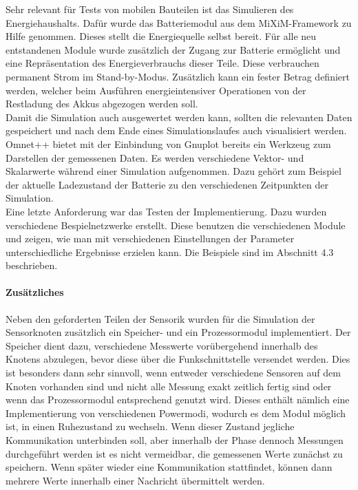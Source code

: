 Sehr relevant für Tests von mobilen Bauteilen ist das Simulieren des Energiehaushalts. Dafür wurde das Batteriemodul aus dem MiXiM-Framework zu Hilfe genommen. Dieses stellt die Energiequelle selbst bereit. Für alle neu entstandenen Module wurde zusätzlich der Zugang zur Batterie ermöglicht und eine Repräsentation des Energieverbrauchs dieser Teile. Diese verbrauchen permanent Strom im Stand-by-Modus. Zusätzlich kann ein fester Betrag definiert werden, welcher beim Ausführen energieintensiver Operationen von der Restladung des Akkus abgezogen werden soll.\\
Damit die Simulation auch ausgewertet werden kann, sollten die relevanten Daten gespeichert und nach dem Ende eines Simulationslaufes auch visualisiert werden. Omnet++ bietet mit der Einbindung von Gnuplot bereits ein Werkzeug zum Darstellen der gemessenen Daten. Es werden verschiedene Vektor- und Skalarwerte während einer Simulation aufgenommen. Dazu gehört zum Beispiel der aktuelle Ladezustand der Batterie zu den verschiedenen Zeitpunkten der Simulation.\\
Eine letzte Anforderung war das Testen der Implementierung. Dazu wurden verschiedene Bespielnetzwerke erstellt. Diese benutzen die verschiedenen Module und zeigen, wie man mit verschiedenen Einstellungen der Parameter unterschiedliche Ergebnisse erzielen kann. Die Beispiele sind im Abschnitt 4.3 beschrieben.
\paragraph{Zusätzliches}
Neben den geforderten Teilen der Sensorik wurden für die Simulation der Sensorknoten zusätzlich ein Speicher- und ein Prozessormodul implementiert. Der Speicher dient dazu, verschiedene Messwerte vorübergehend innerhalb des Knotens abzulegen, bevor diese über die Funkschnittstelle versendet werden. Dies ist besonders dann sehr sinnvoll, wenn entweder verschiedene Sensoren auf dem Knoten vorhanden sind und nicht alle Messung exakt zeitlich fertig sind oder wenn das Prozessormodul entsprechend genutzt wird. Dieses enthält nämlich eine Implementierung von verschiedenen Powermodi, wodurch es dem Modul möglich ist, in einen Ruhezustand zu wechseln. Wenn dieser Zustand jegliche Kommunikation unterbinden soll, aber innerhalb der Phase dennoch Messungen durchgeführt werden ist es nicht vermeidbar, die gemessenen Werte zunächst zu speichern. Wenn später wieder eine Kommunikation stattfindet, können dann mehrere Werte innerhalb einer Nachricht übermittelt werden.\\
